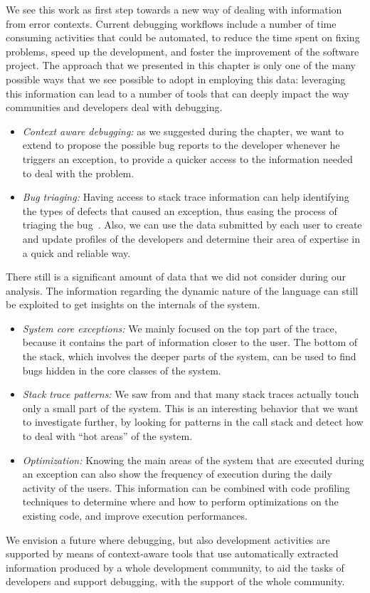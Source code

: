We see this work as first step towards a new way of dealing with information from error contexts.
Current debugging workflows include a number of time consuming activities that could be automated, to reduce the time spent on fixing problems, speed up the development, and foster the improvement of the software project.
The approach that we presented in this chapter is only one of the many possible ways that we see possible to adopt in employing this data: leveraging this information can lead to a number of tools that can deeply impact the way communities and developers deal with debugging.
\begin{itemize}%
\item\textit{Context aware debugging:} as we suggested during the chapter, we want to extend \slr to propose the possible bug reports to the developer whenever he triggers an exception, to provide a quicker access to the information needed to deal with the problem.

\item\textit{Bug triaging:} Having access to stack trace information can help identifying the types of defects that caused an exception, thus easing the process of triaging the bug~\cite{Anvi2006a}.
Also, we can use the data submitted by each user to create and update profiles of the developers and determine their area of expertise in a quick and reliable way.

\end{itemize}

There still is a significant amount of data that we did not consider during our analysis.
The information regarding the dynamic nature of the language can still be exploited to get insights on the internals of the system.

\begin{itemize}%

\item\textit{System core exceptions:} We mainly focused on the top part of the trace, because it contains the part of information closer to the user.
The bottom of the stack, which involves the deeper parts of the system, can be used to find bugs hidden in the core classes of the system.

\item\textit{Stack trace patterns:} We saw from  and  that many stack traces actually touch only a small part of the system.
This is an interesting behavior that we want to investigate further, by looking for patterns in the call stack and detect how to deal with ``hot areas'' of the system.

\item\textit{Optimization:} Knowing the main areas of the system that are executed during an exception can also show the frequency of execution during the daily activity of the users.
This information can be combined with code profiling techniques to determine where and how to perform optimizations on the existing code, and improve execution performances.
\end{itemize}

We envision a future where debugging, but also development activities are supported by means of context-aware tools that use automatically extracted information produced by a whole development community, to aid the tasks of developers and support debugging, with the support of the whole community.
